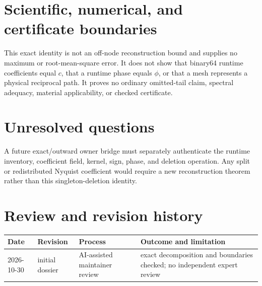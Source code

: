 \documentclass[11pt]{article}
\begin{document}
\section{Scientific, numerical, and certificate boundaries}
This exact identity is not an off-node reconstruction bound and supplies no maximum or
root-mean-square error.  It does not show that binary64 runtime coefficients equal $c$, that a
runtime phase equals $\phi$, or that a mesh represents a physical reciprocal path.  It proves no
ordinary omitted-tail claim, spectral adequacy, material applicability, or checked certificate.

\section{Unresolved questions}
A future exact/outward owner bridge must separately authenticate the runtime inventory, coefficient
field, kernel, sign, phase, and deletion operation.  Any split or redistributed Nyquist coefficient
would require a new reconstruction theorem rather than this singleton-deletion identity.

\section{Review and revision history}
\begin{tabularx}{\textwidth}{@{}lllX@{}}
\toprule
Date & Revision & Process & Outcome and limitation \\
\midrule
2026-10-30 & initial dossier & AI-assisted maintainer review & exact decomposition and boundaries checked; no independent expert review \\
\bottomrule
\end{tabularx}
\end{document}
